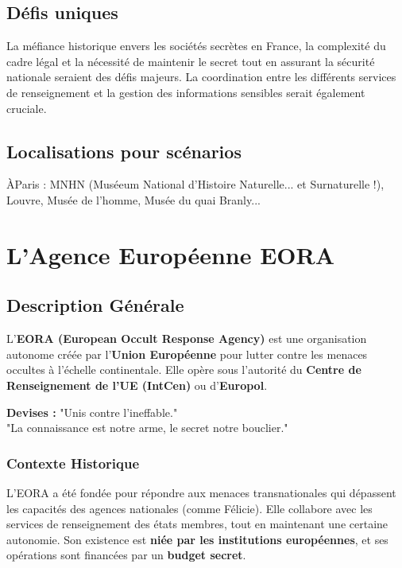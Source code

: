 \documentclass[10pt,a5paper,twoside]{book}
\begin{document}
\section{Défis uniques}

La méfiance historique envers les sociétés secrètes en France, la complexité du cadre légal et la nécessité de maintenir le secret tout en assurant la sécurité nationale seraient des défis majeurs. La coordination entre les différents services de renseignement et la gestion des informations sensibles serait également cruciale.

\section{Localisations pour scénarios}

ÀParis : MNHN (Muséeum National d'Histoire Naturelle... et Surnaturelle !), Louvre, Musée de l'homme, Musée du quai Branly... 

\chapter{L'Agence Européenne EORA}

\section{Description Générale}

L'\textbf{EORA (European Occult Response Agency)} est une organisation autonome créée par l'\textbf{Union Européenne} pour lutter contre les menaces occultes à l'échelle continentale. Elle opère sous l'autorité du \textbf{Centre de Renseignement de l'UE (IntCen)} ou d'\textbf{Europol}.

\begin{shaded}
\textbf{Devises :} "Unis contre l'ineffable." \\ "La connaissance est notre arme, le secret notre bouclier."
\end{shaded}

\subsection{Contexte Historique}
L'EORA a été fondée pour répondre aux menaces transnationales qui dépassent les capacités des agences nationales (comme Félicie). Elle collabore avec les services de renseignement des états membres, tout en maintenant une certaine autonomie. Son existence est \textbf{niée par les institutions européennes}, et ses opérations sont financées par un \textbf{budget secret}.
\end{document}
